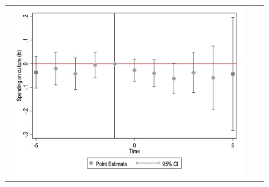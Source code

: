 \begin{figure}[!ht]
\begin{tabular}{@{}ccc@{}}
\begin{minipage}[t]{0.32\textwidth}
            \includegraphics[width=\linewidth]{images/pop_10000/caseventdd_ln_q4_05_step1.jpg}
            \label{fig:casculture}
        \end{minipage} \\[10pt]


\end{tabular}
\end{figure}
